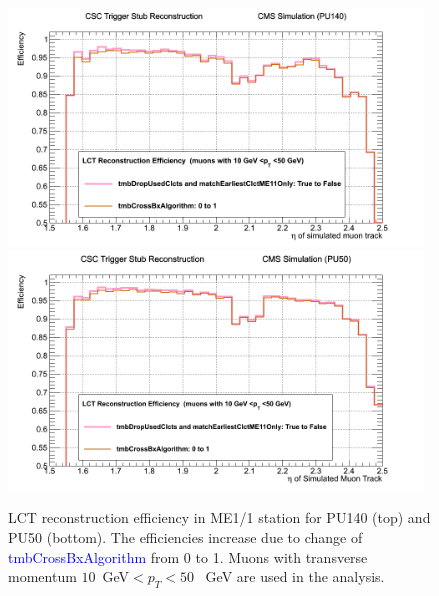 \begin{figure}[h!]
\includegraphics[width=0.98\textwidth]{figures/PU140_Improv_from7_to_8.png}
\includegraphics[width=0.98\textwidth]{figures/PU50_Improv_from7_to_8.png}
\caption{LCT reconstruction efficiency in ME1/1 station for PU140 (top) and PU50 (bottom). The efficiencies increase due to change of \textcolor{blue}{tmbCrossBxAlgorithm} from 0 to 1. Muons with transverse momentum $10$~GeV$<p_T<50$~ GeV are used in the analysis.}
\label{fig:From7to8}
\end{figure}
